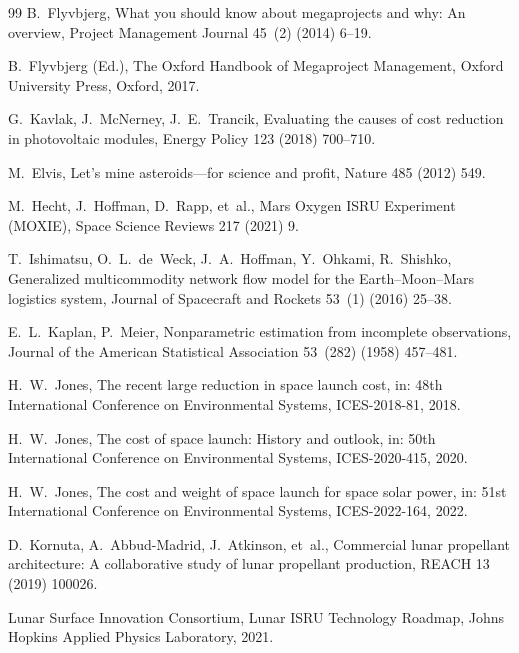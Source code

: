 \documentclass[preprint,12pt]{elsarticle}
\begin{document}
\begin{thebibliography}{99}
B.~Flyvbjerg,
\newblock What you should know about megaprojects and why: An overview,
\newblock Project Management Journal 45~(2) (2014) 6--19.

B.~Flyvbjerg (Ed.),
\newblock The Oxford Handbook of Megaproject Management,
\newblock Oxford University Press, Oxford, 2017.

G.~Kavlak, J.~McNerney, J.~E.~Trancik,
\newblock Evaluating the causes of cost reduction in photovoltaic modules,
\newblock Energy Policy 123 (2018) 700--710.

M.~Elvis,
\newblock Let's mine asteroids---for science and profit,
\newblock Nature 485 (2012) 549.

M.~Hecht, J.~Hoffman, D.~Rapp, et~al.,
\newblock Mars Oxygen ISRU Experiment (MOXIE),
\newblock Space Science Reviews 217 (2021) 9.

T.~Ishimatsu, O.~L.~de~Weck, J.~A.~Hoffman, Y.~Ohkami, R.~Shishko,
\newblock Generalized multicommodity network flow model for the Earth--Moon--Mars logistics system,
\newblock Journal of Spacecraft and Rockets 53~(1) (2016) 25--38.

E.~L.~Kaplan, P.~Meier,
\newblock Nonparametric estimation from incomplete observations,
\newblock Journal of the American Statistical Association 53~(282) (1958) 457--481.

H.~W.~Jones,
\newblock The recent large reduction in space launch cost,
\newblock in: 48th International Conference on Environmental Systems, ICES-2018-81, 2018.

H.~W.~Jones,
\newblock The cost of space launch: History and outlook,
\newblock in: 50th International Conference on Environmental Systems, ICES-2020-415, 2020.

H.~W.~Jones,
\newblock The cost and weight of space launch for space solar power,
\newblock in: 51st International Conference on Environmental Systems, ICES-2022-164, 2022.

D.~Kornuta, A.~Abbud-Madrid, J.~Atkinson, et~al.,
\newblock Commercial lunar propellant architecture: A collaborative study of lunar propellant production,
\newblock REACH 13 (2019) 100026.

Lunar Surface Innovation Consortium,
\newblock Lunar ISRU Technology Roadmap,
\newblock Johns Hopkins Applied Physics Laboratory, 2021.


\end{thebibliography}
\end{document}
